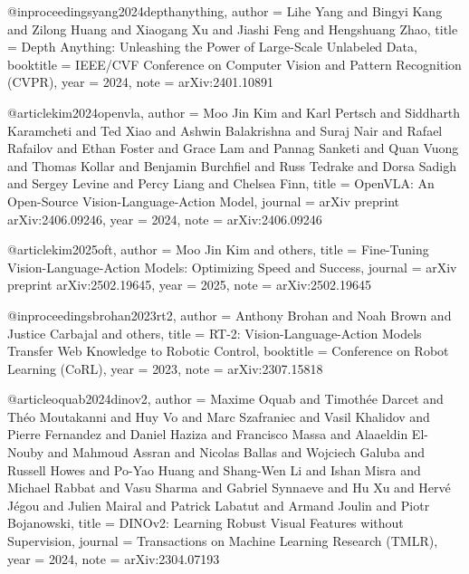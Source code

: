 @inproceedings{yang2024depthanything,
  author    = {Lihe Yang and Bingyi Kang and Zilong Huang and Xiaogang Xu and Jiashi Feng and Hengshuang Zhao},
  title     = {Depth Anything: Unleashing the Power of Large-Scale Unlabeled Data},
  booktitle = {IEEE/CVF Conference on Computer Vision and Pattern Recognition (CVPR)},
  year      = {2024},
  note      = {arXiv:2401.10891}
}


@article{kim2024openvla,
  author    = {Moo Jin Kim and Karl Pertsch and Siddharth Karamcheti and Ted Xiao and Ashwin Balakrishna and Suraj Nair and Rafael Rafailov and Ethan Foster and Grace Lam and Pannag Sanketi and Quan Vuong and Thomas Kollar and Benjamin Burchfiel and Russ Tedrake and Dorsa Sadigh and Sergey Levine and Percy Liang and Chelsea Finn},
  title     = {{OpenVLA}: An Open-Source Vision-Language-Action Model},
  journal   = {arXiv preprint arXiv:2406.09246},
  year      = {2024},
  note      = {arXiv:2406.09246}
}

@article{kim2025oft,
  author    = {Moo Jin Kim and others},
  title     = {Fine-Tuning Vision-Language-Action Models: Optimizing Speed and Success},
  journal   = {arXiv preprint arXiv:2502.19645},
  year      = {2025},
  note      = {arXiv:2502.19645}
}

@inproceedings{brohan2023rt2,
  author    = {Anthony Brohan and Noah Brown and Justice Carbajal and others},
  title     = {{RT-2}: Vision-Language-Action Models Transfer Web Knowledge to Robotic Control},
  booktitle = {Conference on Robot Learning (CoRL)},
  year      = {2023},
  note      = {arXiv:2307.15818}
}

@article{oquab2024dinov2,
  author    = {Maxime Oquab and Timoth\'{e}e Darcet and Th\'{e}o Moutakanni and Huy Vo and Marc Szafraniec and Vasil Khalidov and Pierre Fernandez and Daniel Haziza and Francisco Massa and Alaaeldin El-Nouby and Mahmoud Assran and Nicolas Ballas and Wojciech Galuba and Russell Howes and Po-Yao Huang and Shang-Wen Li and Ishan Misra and Michael Rabbat and Vasu Sharma and Gabriel Synnaeve and Hu Xu and Herv\'{e} J\'{e}gou and Julien Mairal and Patrick Labatut and Armand Joulin and Piotr Bojanowski},
  title     = {{DINOv2}: Learning Robust Visual Features without Supervision},
  journal   = {Transactions on Machine Learning Research (TMLR)},
  year      = {2024},
  note      = {arXiv:2304.07193}
}

